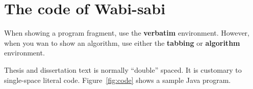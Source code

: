 \documentclass[dissertation]{bsu-cs}  %
\begin{document}
\section{The code of Wabi-sabi}

When showing a program fragment, use the \textbf{verbatim} environment. However, when you wan
to show an algorithm, use either the \textbf{tabbing} or \textbf{algorithm} environment.

Thesis and dissertation text is normally ``double'' spaced.  It is customary to single-space
literal code.  Figure~\ref{fig:code} shows a sample Java program.

%
%
%
% 
\end{document}
